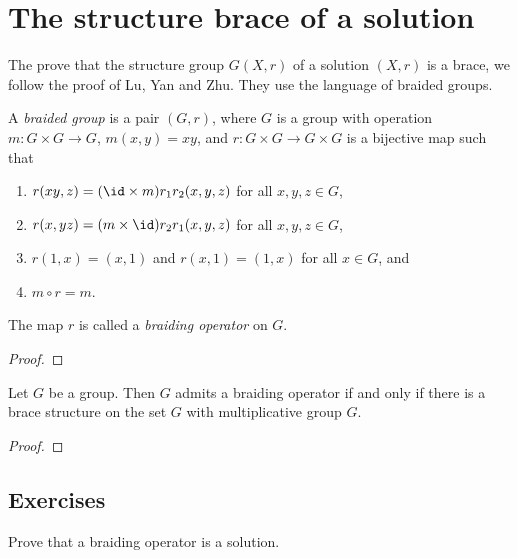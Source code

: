 \chapter{The structure brace of a solution}
\label{structure_brace}


The prove that the structure group $G(X,r)$ of a solution $(X,r)$ is a brace, we follow the 
proof of Lu, Yan and Zhu. They use the language of braided groups.

\begin{definition}
A \emph{braided group} is a pair $(G,r)$, where 
$G$ is a group with operation $m\colon G\times G\to G$, $m(x,y)=xy$, and 
$r\colon G\times G\to G\times G$ is a bijective map such that
\begin{enumerate}
\item $r(xy,z)=(\id\times m)r_1r_2(x,y,z)$ for all $x,y,z\in G$,
\item $r(x,yz)=(m\times\id)r_2r_1(x,y,z)$ for all $x,y,z\in G$,
\item $r(1,x)=(x,1)$ and $r(x,1)=(1,x)$ for all $x\in G$, and 
\item $m\circ r=m$.
\end{enumerate}
The map $r$ is called a \emph{braiding operator} on $G$. 
\end{definition}


\begin{proof}

\end{proof}

\begin{theorem}
    Let $G$ be a group. Then $G$ admits a braiding operator if and only if 
    there is a brace structure on the set $G$ with multiplicative group $G$. 
\end{theorem}

\begin{proof}
\end{proof}

\section*{Exercises}

\begin{prob}
Prove that a braiding operator is a solution. 
\end{prob}

